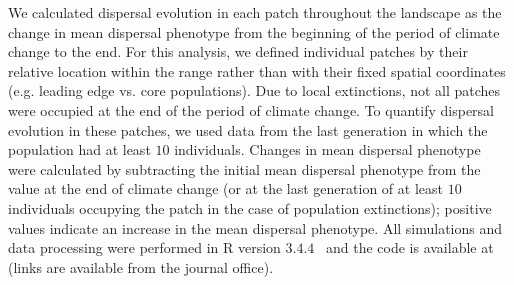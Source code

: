 \documentclass[11pt]{article}
\begin{document}
We calculated dispersal evolution in each patch throughout the landscape as the change in mean dispersal phenotype from the beginning of the period of climate change to the end. For this analysis, we defined individual patches by their relative location within the range rather than with their fixed spatial coordinates (e.g. leading edge vs. core populations). Due to local extinctions, not all patches were occupied at the end of the period of climate change. To quantify dispersal evolution in these patches, we used data from the last generation in which the population had at least $10$ individuals. Changes in mean dispersal phenotype were calculated by subtracting the initial mean dispersal phenotype from the value at the end of climate change (or at the last generation of at least $10$ individuals occupying the patch in the case of population extinctions); positive values indicate an increase in the mean dispersal phenotype. All simulations and data processing were performed in R version $3.4.4$~\citep{team2000r} and the code is available at (links are available from the journal office).
\end{document}
